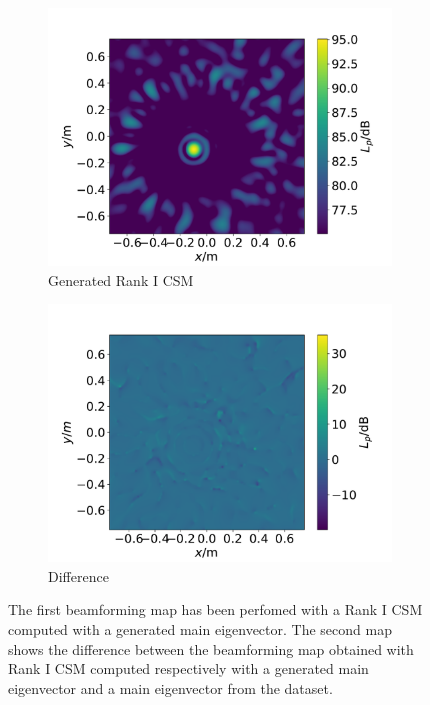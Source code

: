 \documentclass[11pt,a4paper,twoside]{report}
\begin{document}
\begin{figure}
    \centering
    \begin{subfigure}{0.45\textwidth}
        \centering
        \includegraphics[width=1.3\textwidth]{figs/beamforming_map_main_evec_wgangp_generated.pdf}
        \caption{Generated Rank I CSM}
        \label{fig:beamforming_map_main_evec_wgangp_generated}
    \end{subfigure}
    \hfill
    \begin{subfigure}{0.45\textwidth}
        \centering
        \includegraphics[width=1.3\textwidth]{figs/beamforming_map_main_evec_wgangp_difference.pdf}
        \caption{Difference}
        \label{fig:beamforming_map_main_evec_wgangp_difference}
    \end{subfigure}
    \caption{The first beamforming map has been perfomed with a Rank I CSM computed with a generated main eigenvector. The second map shows the difference between the beamforming map obtained with Rank I CSM computed respectively with a generated main eigenvector and a main eigenvector from the dataset.}
    \label{fig:beamforming_map_main_evec_wgangp}
\end{figure}
\end{document}
